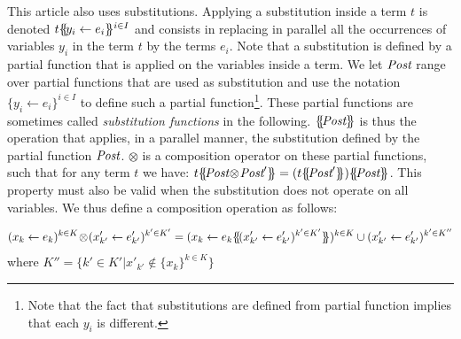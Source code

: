 \documentclass{lmcs}
\newcommand{\TODO}[1]{\textcolor{red}{\textbf{[TODO:#1]}}}
\newcommand{\ERIC}[1]{\textcolor{blue}{#1}}
\newcommand{\LUDO}[1]{\textcolor{darkgreen}{#1}}
\newcommand{\shortotimes}{\!\otimes\!}
\begin{document}
This article also uses substitutions. Applying a substitution inside a term $t$ is denoted $t\{\hspace{-0.68ex}\{\!y_i\gets e_i\}\hspace{-0.67ex}\}^{i\in I}$ and consists in replacing in parallel all the occurrences of variables $y_i$ in the term $t$ by the terms $e_i$. Note that a substitution is defined by a partial function that is applied on the variables inside a term. We let $\Post$ range over partial functions that are used as substitution and use the notation $\{y_i\gets e_i\}^{i\in I}$ to define such a partial function\footnote{Note that the fact that substitutions are defined from partial function  implies that each $y_i$ is different.}. These partial functions are sometimes called \emph{substitution functions} in the following.
 $\subst{\Post}$ is thus the operation that applies,  in a parallel manner,  the substitution defined by the partial function $\Post$. $\otimes$ is a composition operator on these partial functions, such that for any term $t$ we have: $t\subst{\Post\shortotimes\Post'} = (t\subst{\Post'})\subst{\Post}$.
This property must also be valid when the substitution does not operate on all variables.
We thus define a composition operation as follows: 
%

\[(x_{k}\gets e_{k})^{k\in K}\shortotimes (x'_{k'}\gets e'_{k'})^{k'\in K'} =  
(x_{k}\gets e_{k}\subst{(x'_{k'}\gets e'_{k'})^{k'\in K'}})^{k\in K} \cup (x'_{k'}\gets e'_{k'})^{k'\in K''}\]
where $K''=\{k'\in K'|x'_{k'}\not\in\{x_k\}^{k\in K}\}$
%
%
% 
\end{document}
